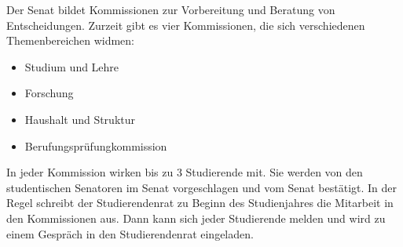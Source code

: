 Der Senat bildet Kommissionen zur Vorbereitung und Beratung von Entscheidungen.
Zurzeit gibt es vier Kommissionen, die sich verschiedenen Themenbereichen widmen:

\begin{itemize}
    \item Studium und Lehre
    \item Forschung
    \item Haushalt und Struktur
    \item Berufungsprüfungkommission
\end{itemize}

In jeder Kommission wirken bis zu 3 Studierende mit.
Sie werden von den studentischen Senatoren im Senat vorgeschlagen und vom Senat bestätigt.
In der Regel schreibt der Studierendenrat zu Beginn des Studienjahres die Mitarbeit in den Kommissionen aus.
Dann kann sich jeder Studierende melden und wird zu einem Gespräch in den Studierendenrat eingeladen.


